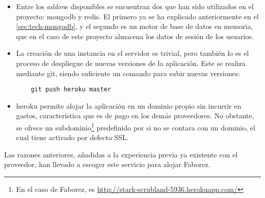 \documentclass[main]{subfiles}
\begin{document}
\begin{itemize}
  \item Entre los \emph{addon}s disponibles se encuentran dos que han sido utilizados en el proyecto: \gls{mongodb} y \gls{redis}. El primero ya se ha explicado anteriormente en el \cref{sec:tech-mongodb}, y el segundo es un motor de base de datos en memoria, que en el caso de este proyecto almacena los datos de sesión de los usuarios.
  \item La creación de una instancia en el servidor es trivial, pero también lo es el proceso de despliegue de nuevas versiones de la aplicación. Este se realiza mediante \gls{git}, siendo suficiente un comando para subir nuevas versiones:
  \begin{verbatim}
    git push heroku master
  \end{verbatim}
  \item \Gls{heroku} permite alojar la aplicación en un dominio propio sin incurrir en gastos, característica que es de pago en los demás proveedores. No obstante, se ofrece un subdominio\footnote{En el caso de Faborez, es \url{http://stark-scrubland-5936.herokuapp.com/}} predefinido por si no se contara con un dominio, el cual tiene activado por defecto SSL.
\end{itemize}

Las razones anteriores, añadidas a la experiencia previa ya existente con el proveedor, han llevado a escoger este servicio para alojar Faborez.
\end{document}
